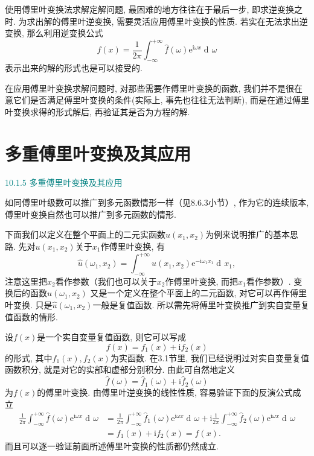\documentclass[aspectratio=169,notheorems,12pt,compress,UTF8]{ctexbeamer} %
\DeclareMathOperator\dif{d\!}
\newcommand{\me}{\mathrm{e}}
\newcommand{\mi}{\mathrm{i}}
\newcommand{\spb}{\vspace{3mm}}
\begin{document}
\begin{frame}
\qquad 使用傅里叶变换法求解定解问题, 最困难的地方往往在于最后一步, 即求逆变换之时.
为求出解的傅里叶逆变换, 需要灵活应用傅里叶变换的性质. 若实在无法求出逆变换,
那么利用逆变换公式
\begin{equation*}
f(x)=\frac{1}{2\pi}\int_{-\infty}^{+\infty}
\widehat{f}(\omega)\me^{\mi\omega x}\dif\omega
\end{equation*}
表示出来的解的形式也是可以接受的.\pause\spb

\qquad 在应用傅里叶变换求解问题时, 对那些需要作傅里叶变换的函数,
我们并不是很在意它们是否满足傅里叶变换的条件(实际上, 事先也往往无法判断),
而是在通过傅里叶变换求得的形式解后, 再验证其是否为方程的解.

\end{frame}


\section{多重傅里叶变换及其应用}
\begin{frame}
\textcolor{teal}{10.1.5 多重傅里叶变换及其应用}\spb

\qquad 如同傅里叶级数可以推广到多元函数情形一样（见8.6.3小节）,
作为它的连续版本, 傅里叶变换自然也可以推广到多元函数的情形.\pause\spb

\qquad 下面我们以定义在整个平面上的二元实函数$u(x_1,x_2)$为例来说明推广的基本思路. \pause
先对$u(x_1,x_2)$关于$x_1$作傅里叶变换, 有
$$
\widehat{u}(\omega_1,x_2)=\int_{-\infty}^{+\infty}u(x_1,x_2)\me^{-\mi\omega_1x_1}\dif x_1,
$$
注意这里把$x_2$看作参数（我们也可以关于$x_2$作傅里叶变换,
而把$x_1$看作参数）. \pause 变换后的函数$\widehat{u}(\omega_1,x_2)$
又是一个定义在整个平面上的二元函数, 对它可以再作傅里叶变换.
只是$\widehat{u}(\omega_1,x_2)$一般是复值函数.
所以需先将傅里叶变换推广到实自变量复值函数的情形.
\end{frame}

\begin{frame}
\qquad 设$f(x)$是一个实自变量复值函数, 则它可以写成
$$
f(x)=f_1(x)+\mi f_2(x)
$$
的形式, 其中$f_1(x),f_2(x)$为实函数. 在3.1节里, 我们已经说明过对实自变量复值函数积分, 就是对它的实部和虚部分别积分. 由此可自然地定义
$$
\widehat{f}(\omega)=\widehat{f}_1(\omega)+\mi\widehat{f}_2(\omega)
$$
为$f(x)$的傅里叶变换. \pause 由傅里叶逆变换的线性性质, 容易验证下面的反演公式成立
\begin{align*}
\frac{1}{2\pi}\int_{-\infty}^{+\infty}\widehat{f}(\omega)\me^{\mi\omega
x}\dif\omega &=\frac{1}{2\pi}\int_{-\infty}^{+\infty}\widehat{f}_1(\omega)\me^{\mi\omega
x}\dif\omega+\mi\frac{1}{2\pi}\int_{-\infty}^{+\infty}\widehat{f}_2(\omega)\me^{\mi\omega
x}\dif\omega\\
&=f_1(x)+\mi f_2(x)=f(x).
\end{align*}\pause
而且可以逐一验证前面所述傅里叶变换的性质都仍然成立.
\end{frame}
\end{document}
